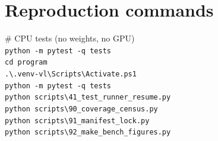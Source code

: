 \section{Reproduction commands}
\label{app:repro}

\begin{flushleft}
\ttfamily\small
\# CPU tests (no weights, no GPU)\\
\verb|python -m pytest -q tests|\\
\verb|cd program|\\
\verb|.\.venv-vl\Scripts\Activate.ps1|\\
\verb|python -m pytest -q tests|\\
\verb|python scripts\41_test_runner_resume.py|\\
\verb|python scripts\90_coverage_census.py|\\
\verb|python scripts\91_manifest_lock.py|\\
\verb|python scripts\92_make_bench_figures.py|
\end{flushleft}
